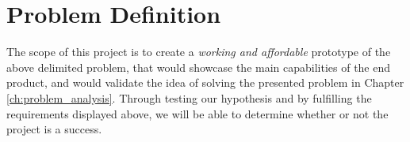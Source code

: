 \section{Problem Definition}

The scope of this project is to create a \textit{working and affordable} prototype of the above delimited problem, that would showcase the main capabilities of the end product, and would validate the idea of solving the presented problem in Chapter \ref{ch:problem_analysis}.
Through testing our hypothesis and by fulfilling the requirements displayed above, we will be able to determine whether or not the project is a success.

